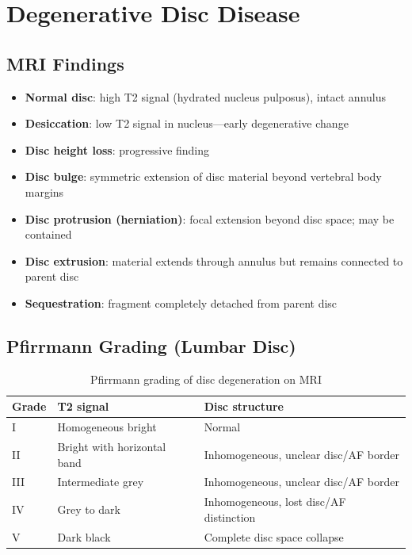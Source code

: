 \section{Degenerative Disc Disease}

\subsection{MRI Findings}
\begin{itemize}
  \item \textbf{Normal disc}: high T2 signal (hydrated nucleus pulposus), intact annulus
  \item \textbf{Desiccation}: low T2 signal in nucleus---early degenerative change
  \item \textbf{Disc height loss}: progressive finding
  \item \textbf{Disc bulge}: symmetric extension of disc material beyond vertebral body margins
  \item \textbf{Disc protrusion (herniation)}: focal extension beyond disc space; may be contained
  \item \textbf{Disc extrusion}: material extends through annulus but remains connected to parent disc
  \item \textbf{Sequestration}: fragment completely detached from parent disc
\end{itemize}

\subsection{Pfirrmann Grading (Lumbar Disc)}
\begin{table}[h]
\centering
\caption{Pfirrmann grading of disc degeneration on MRI}
\begin{tabular}{|l|l|l|}
\hline
\textbf{Grade} & \textbf{T2 signal} & \textbf{Disc structure} \\
\hline
I & Homogeneous bright & Normal \\
II & Bright with horizontal band & Inhomogeneous, unclear disc/AF border \\
III & Intermediate grey & Inhomogeneous, unclear disc/AF border \\
IV & Grey to dark & Inhomogeneous, lost disc/AF distinction \\
V & Dark black & Complete disc space collapse \\
\hline
\end{tabular}
\end{table}

